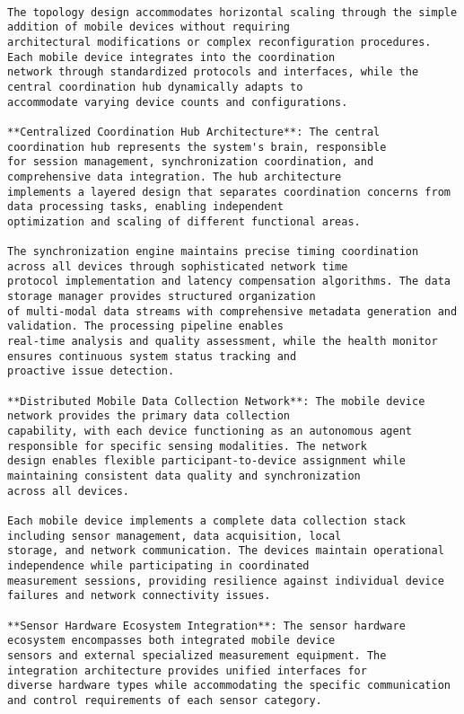 \documentclass[11pt,a4paper]{report}
\begin{document}
\begin{verbatim}

The topology design accommodates horizontal scaling through the simple addition of mobile devices without requiring
architectural modifications or complex reconfiguration procedures. Each mobile device integrates into the coordination
network through standardized protocols and interfaces, while the central coordination hub dynamically adapts to
accommodate varying device counts and configurations.

**Centralized Coordination Hub Architecture**: The central coordination hub represents the system's brain, responsible
for session management, synchronization coordination, and comprehensive data integration. The hub architecture
implements a layered design that separates coordination concerns from data processing tasks, enabling independent
optimization and scaling of different functional areas.

The synchronization engine maintains precise timing coordination across all devices through sophisticated network time
protocol implementation and latency compensation algorithms. The data storage manager provides structured organization
of multi-modal data streams with comprehensive metadata generation and validation. The processing pipeline enables
real-time analysis and quality assessment, while the health monitor ensures continuous system status tracking and
proactive issue detection.

**Distributed Mobile Data Collection Network**: The mobile device network provides the primary data collection
capability, with each device functioning as an autonomous agent responsible for specific sensing modalities. The network
design enables flexible participant-to-device assignment while maintaining consistent data quality and synchronization
across all devices.

Each mobile device implements a complete data collection stack including sensor management, data acquisition, local
storage, and network communication. The devices maintain operational independence while participating in coordinated
measurement sessions, providing resilience against individual device failures and network connectivity issues.

**Sensor Hardware Ecosystem Integration**: The sensor hardware ecosystem encompasses both integrated mobile device
sensors and external specialized measurement equipment. The integration architecture provides unified interfaces for
diverse hardware types while accommodating the specific communication and control requirements of each sensor category.


\end{verbatim}
\end{document}
